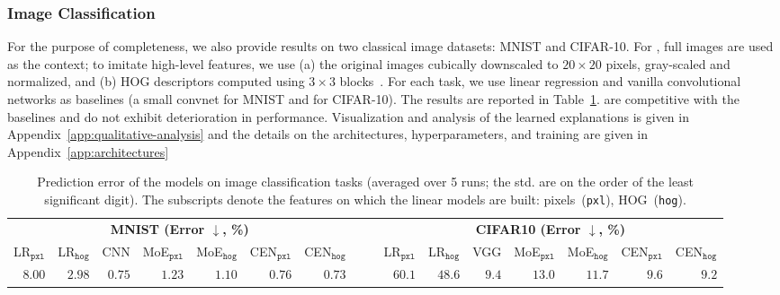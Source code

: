 \documentclass[twoside,11pt]{article}
\begin{document}
\subsubsection{Image Classification}
\label{sec:applications-classification-image-classification}

For the purpose of completeness, we also provide results on two classical image datasets: MNIST and CIFAR-10.
For {\CEN}, full images are used as the context; to imitate high-level features, we use (a) the original images cubically downscaled to $20 \times 20$ pixels, gray-scaled and normalized, and (b) HOG descriptors computed using $3 \times 3$ blocks~\citep{dalal2005histograms}.
For each task, we use linear regression and vanilla convolutional networks as baselines (a small convnet for MNIST and {\VGG} for CIFAR-10).
The results are reported in Table~\ref{tab:img_performance}.
{\CENs} are competitive with the baselines and do not exhibit deterioration in performance.
Visualization and analysis of the learned explanations is given in Appendix~\ref{app:qualitative-analysis} and the details on the architectures, hyperparameters, and training are given in Appendix~\ref{app:architectures}


\begin{table}[H]
\centering
\caption{Prediction error of the models on image classification tasks (averaged over 5 runs; the std. are on the order of the least significant digit).
The subscripts denote the features on which the linear models are built: pixels~(\texttt{pxl}), HOG~(\texttt{hog}).}
\label{tab:img_performance}
\vspace{-1ex}
\fontsize{8}{10}\selectfont
\def\arraystretch{1.2}
\setlength\tabcolsep{2.5pt}
\begin{tabular}[t]{@{}rrr rrrr rr rrr rrrr@{}}
\toprule
    \multicolumn{7}{c}{\textbf{MNIST (Error $\downarrow$, \%)}} & & &
    \multicolumn{7}{c}{\textbf{CIFAR10 (Error $\downarrow$, \%)}} \\
    \cmidrule{1-7} \cmidrule{10-16}
    LR$_\texttt{pxl}$ & LR$_\texttt{hog}$ & CNN & MoE$_\texttt{pxl}$  & MoE$_\texttt{hog}$ & CEN$_\texttt{pxl}$ & CEN$_\texttt{hog}$ & & & LR$_\texttt{pxl}$ &  LR$_\texttt{hog}$ & VGG & MoE$_\texttt{pxl}$ & MoE$_\texttt{hog}$ &  CEN$_\texttt{pxl}$ & CEN$_\texttt{hog}$ \\
\cmidrule{1-7} \cmidrule{10-16}
$8.00$ & $2.98$  & $\mathbf{0.75}$ & $1.23$ & $1.10$ & $\mathbf{0.76}$ & $\mathbf{0.73}$  & & & $60.1$ & $48.6$ & $9.4$ & $13.0$ & $11.7$ & $9.6$ & $\mathbf{9.2}$ \\
\bottomrule
\end{tabular}
\vspace{-1ex}
\end{table}
 
\end{document}
